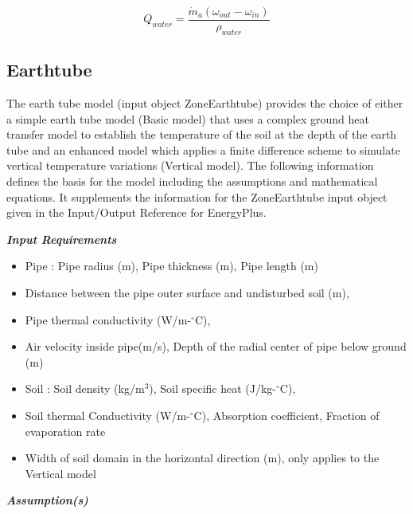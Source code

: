 \begin{equation}
{Q_{water}} = \frac{{{{\dot m}_a}({\omega_{out}} - {\omega_{in}})}}{{{\rho_{water}}}}
\end{equation}

\subsection{Earthtube}\label{earthtube}

The earth tube model (input object ZoneEarthtube) provides the choice of either a simple earth tube model (Basic model) that uses a complex ground heat transfer model to establish the temperature of the soil at the depth of the earth tube and an enhanced model which applies a finite difference scheme to simulate vertical temperature variations (Vertical model). The following information defines the basis for the model including the assumptions and mathematical equations. It supplements the information for the ZoneEarthtube input object given in the Input/Output Reference for EnergyPlus.

\emph{\textbf{Input Requirements}}

\begin{itemize}
\tightlist
\item Pipe : Pipe radius (m), Pipe thickness (m), Pipe length (m)
\item Distance between the pipe outer surface and undisturbed soil (m),
\item Pipe thermal conductivity (W/m-\(^{\circ}\)C),
\item Air velocity inside pipe(m/s), Depth of the radial center of pipe below ground (m)
\item Soil : Soil density (kg/m\(^{3}\)), Soil specific heat (J/kg-\(^{\circ}\)C),
\item Soil thermal Conductivity (W/m-\(^{\circ}\)C), Absorption coefficient, Fraction of evaporation rate
\item Width of soil domain in the horizontal direction (m), only applies to the Vertical model
\end{itemize}

\emph{\textbf{Assumption(s)}}

